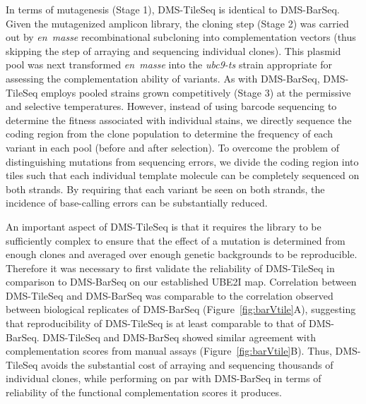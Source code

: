 In terms of mutagenesis (Stage 1), DMS-TileSeq is identical to DMS-BarSeq.  Given the mutagenized amplicon library, the cloning step (Stage 2) was carried out by \textit{en~masse} recombinational subcloning into complementation vectors (thus skipping the step of arraying and sequencing individual clones).  This plasmid pool was next transformed \textit{en~masse} into the \textit{ubc9-ts} strain appropriate for assessing the complementation ability of  variants. As with DMS-BarSeq, DMS-TileSeq employs pooled strains grown competitively (Stage 3) at the permissive and selective temperatures. However, instead of using barcode sequencing to determine the fitness associated with individual stains, we directly sequence the coding region from the clone population to determine the frequency of each variant in each pool (before and after selection). To overcome the problem of distinguishing mutations from sequencing errors, we divide the coding region into tiles such that each individual template molecule can be completely sequenced on both strands.  By requiring that each variant be seen on both strands, the incidence of base-calling errors can be substantially reduced. %

An important aspect of DMS-TileSeq is that it requires the library to be sufficiently complex to ensure that the effect of a mutation is determined from enough clones and averaged over enough genetic backgrounds to be reproducible. Therefore it was necessary to first validate the reliability of DMS-TileSeq in comparison to DMS-BarSeq on our established UBE2I map. Correlation between DMS-TileSeq and DMS-BarSeq was comparable to the correlation observed between biological replicates of DMS-BarSeq (Figure~\ref{fig:barVtile}A), suggesting that reproducibility of DMS-TileSeq is at least comparable to that of DMS-BarSeq. DMS-TileSeq and DMS-BarSeq showed similar agreement with complementation scores from manual assays (Figure~\ref{fig:barVtile}B). Thus, DMS-TileSeq avoids the substantial cost of arraying and sequencing thousands of individual clones, while performing on par with DMS-BarSeq in terms of reliability of the functional complementation scores it produces.

